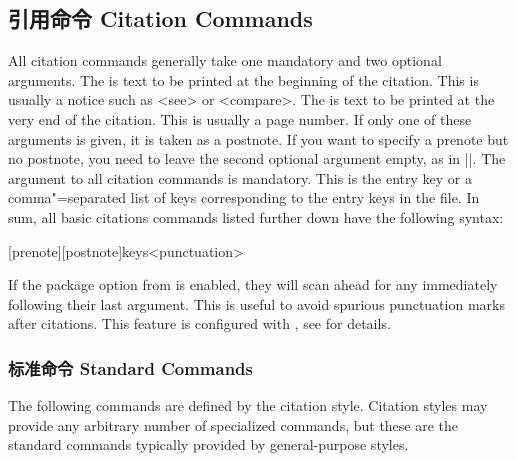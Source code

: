 \subsection{引用命令 Citation Commands}
\label{use:cit}

All citation commands generally take one mandatory and two optional arguments. The  is text to be printed at the beginning of the citation. This is usually a notice such as <see> or <compare>. The  is text to be printed at the very end of the citation. This is usually a page number. If only one of these arguments is given, it is taken as a postnote. If you want to specify a prenote but no postnote, you need to leave the second optional argument empty, as in |\cite[see][]{key}|. The  argument to all citation commands is mandatory. This is the entry key or a comma"=separated list of keys corresponding to the entry keys in the  file. In sum, all basic citations commands listed further down have the following syntax:

\begin{ltxsyntax}

[prenote][postnote]{keys}<punctuation>

If the  package option from  is enabled, they will scan ahead for any  immediately following their last argument. This is useful to avoid spurious punctuation marks after citations. This feature is configured with , see  for details.

\end{ltxsyntax}

\subsubsection{标准命令 Standard Commands}
\label{use:cit:std}

The following commands are defined by the citation style. Citation styles may provide any arbitrary number of specialized commands, but these are the standard commands typically provided by general-purpose styles.

